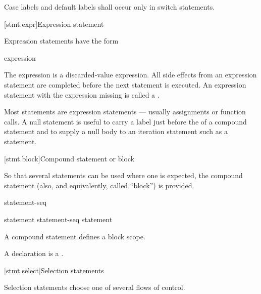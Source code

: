 \pnum
{}%
%
Case labels and default labels shall occur only in switch statements.


[stmt.expr]{Expression statement}%

\pnum
Expression statements have the form

\begin{bnf}
\br
    expression\opt{} \terminal{;}
\end{bnf}

The expression is
a discarded-value expression.
All
%
side effects from an expression statement
are completed before the next statement is executed.
%
%
An expression statement with the expression missing is called
a .
\begin{note}
Most statements are expression statements --- usually assignments or
function calls. A null statement is useful to carry a label just before
the \tcode{\}} of a compound statement and to supply a null body to an
iteration statement such as a 
statement.
\end{note}

[stmt.block]{Compound statement or block}%
%
%

\pnum
So that several statements can be used where one is expected, the
compound statement (also, and equivalently, called ``block'') is
provided.

\begin{bnf}
\br
    \terminal{\{} statement-seq\opt{} \terminal{\}}
\end{bnf}

\begin{bnf}
\br
    statement\br
    statement-seq statement
\end{bnf}

A compound statement defines a block scope.
\begin{note}
A declaration is a .
\end{note}

[stmt.select]{Selection statements}%

\pnum
Selection statements choose one of several flows of control.

